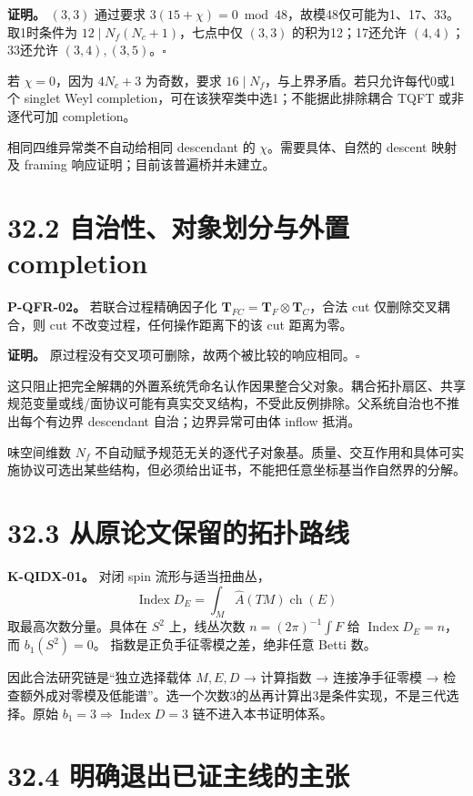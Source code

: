 \documentclass[
  11pt,
  oneside]{book}
\begin{document}
\textbf{证明。} \((3,3)\) 通过要求
\(3(15+\chi)=0\bmod48\)，故模48仅可能为1、17、33。取1时条件为
\(12\mid N_f(N_c+1)\)，七点中仅 \((3,3)\) 的积为12；17还允许
\((4,4)\)；33还允许 \((3,4),(3,5)\)。\(\square\)

若 \(\chi=0\)，因为 \(4N_c+3\) 为奇数，要求
\(16\mid N_f\)，与上界矛盾。若只允许每代0或1个 singlet Weyl
completion，可在该狭窄类中选1；不能据此排除耦合 TQFT 或非逐代可加
completion。

相同四维异常类不自动给相同 descendant 的 \(\chi\)。需要具体、自然的
descent 映射及 framing 响应证明；目前该普遍桥并未建立。

\section{32.2 自治性、对象划分与外置 completion}

\protect\hypertarget{p-qfr-02}{}{}

\textbf{P-QFR-02。} 若联合过程精确因子化
\(\mathbf T_{FC}=\mathbf T_F\otimes\mathbf T_C\)，合法 cut
仅删除交叉耦合，则 cut 不改变过程，任何操作距离下的该 cut 距离为零。

\textbf{证明。}
原过程没有交叉项可删除，故两个被比较的响应相同。\(\square\)

这只阻止把完全解耦的外置系统凭命名认作因果整合父对象。耦合拓扑扇区、共享规范变量或线/面协议可能有真实交叉结构，不受此反例排除。父系统自治也不推出每个有边界
descendant 自治；边界异常可由体 inflow 抵消。

味空间维数 \(N_f\)
不自动赋予规范无关的逐代子对象基。质量、交互作用和具体可实施协议可选出某些结构，但必须给出证书，不能把任意坐标基当作自然界的分解。

\section{32.3 从原论文保留的拓扑路线}

\textbf{K-QIDX-01。} 对闭 spin 流形与适当扭曲丛， \[
\operatorname{Index}D_E=\int_M\widehat A(TM)\operatorname{ch}(E)
\] 取最高次数分量。具体在 \(S^2\) 上，线丛次数 \(n=(2\pi)^{-1}\int F\)
给 \(\operatorname{Index}D_E=n\)，而 \(b_1(S^2)=0\)。
指数是正负手征零模之差，绝非任意 Betti 数。

因此合法研究链是``独立选择载体 \(M,E,D\) → 计算指数 → 连接净手征零模 →
检查额外成对零模及低能谱''。选一个次数3的丛再计算出3是条件实现，不是三代选择。原始
\(b_1=3\Rightarrow\operatorname{Index}D=3\) 链不进入本书证明体系。

\section{32.4 明确退出已证主线的主张}
\end{document}
